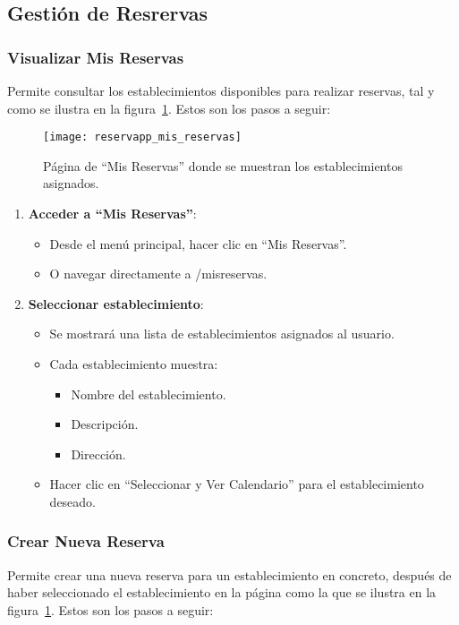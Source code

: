 \subsection{Gestión de Resrervas}

\subsubsection{Visualizar Mis Reservas}
Permite consultar los establecimientos disponibles para realizar reservas, tal y como se ilustra en la figura~\ref{fig:reservapp_mis_reservas}. Estos son los pasos a seguir:

\begin{figure}[H]
	\centering
		\texttt{[image: reservapp\_mis\_reservas]}
	\caption{Página de ``Mis Reservas'' donde se muestran los establecimientos asignados.}
	\label{fig:reservapp_mis_reservas}
\end{figure}

\begin{enumerate}
   \item \textbf{Acceder a ``Mis Reservas''}:
   \begin{itemize}
      \item Desde el menú principal, hacer clic en ``Mis Reservas''.
      \item O navegar directamente a /misreservas.
   \end{itemize}
   \item \textbf{Seleccionar establecimiento}:
   \begin{itemize}
      \item Se mostrará una lista de establecimientos asignados al usuario.
      \item Cada establecimiento muestra:
      \begin{itemize}
         \item Nombre del establecimiento.
         \item Descripción.
         \item Dirección.
      \end{itemize}
      \item Hacer clic en ``Seleccionar y Ver Calendario'' para el establecimiento deseado.
   \end{itemize}
\end{enumerate}

\subsubsection{Crear Nueva Reserva}
Permite crear una nueva reserva para un establecimiento en concreto, después de haber seleccionado el establecimiento en la página como la que se ilustra en la figura~\ref{fig:reservapp_mis_reservas}. Estos son los pasos a seguir:

